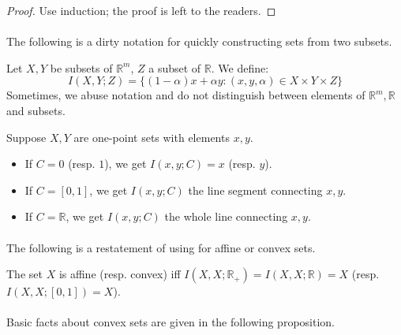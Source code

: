 \begin{proof}
	Use induction; the proof is left to the readers.
\end{proof}

\paragraph{}The following is a dirty notation for quickly constructing sets from two subsets.

\begin{defn}[$I(X,Y;Z)$]\label{defn:011-I}
	Let $X,Y$ be subsets of $\mathbb{R}^m$, $Z$ a subset of $\mathbb{R}$. We define:
	\[
		I(X,Y;Z)=\{(1-\alpha)x+\alpha y:(x,y,\alpha)\in X\times Y\times Z\}
	\]
	Sometimes, we abuse notation and do not distinguish between elements of $\mathbb{R}^m,\mathbb{R}$ and subsets.
\end{defn}

\begin{exmp}\label{defn:011-I-exmpl}
	Suppose $X,Y$ are one-point sets with elements $x, y$.
	\begin{itemize}
		\item If $C=0$ (resp. $1$), we get $I(x,y;C)=x$ (resp. $y$).
		\item If $C=[0,1]$, we get $I(x,y;C)$ the line segment connecting $x, y$.
		\item If $C=\mathbb{R}$, we get $I(x,y;C)$ the whole line connecting $x, y$.
	\end{itemize}
\end{exmp}

\paragraph{}The following is a restatement of  using  for affine or convex sets.

\begin{prop}The set $X$ is affine (resp. convex) iff $I(X,X;\mathbb{R}_{+})=I(X,X;\mathbb{R})=X$ (resp. $I(X,X;[0,1])=X$).
\end{prop}

\paragraph{}Basic facts about convex sets are given in the following proposition.


